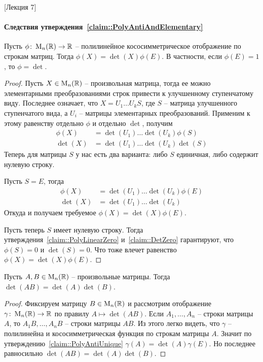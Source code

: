 [Лекция 7]


\paragraph{Следствия утверждения~\ref{claim::PolyAntiAndElementary}}

\begin{claim}
\label{claim::PolyAntiUnique}
Пусть $\phi\colon \operatorname{M}_{n}(\mathbb R)\to \mathbb R$ -- полилинейное кососимметрическое отображение по строкам матриц.
Тогда $\phi(X) = \det(X)\phi(E)$.
В частности, если $\phi(E) = 1$, то $\phi = \det$.
\end{claim}
\begin{proof}
Пусть $X\in\operatorname{M}_{n}(\mathbb R)$ -- произвольная матрица, тогда ее можно элементарными преобразованиями строк привести к улучшенному ступенчатому виду.
Последнее означает, что $X = U_1 \ldots U_k S$, где $S$ -- матрица улучшенного ступенчатого вида, а $U_i$ -- матрицы элементарных преобразований.
Применим к этому равенству отдельно $\phi$ и отдельно $\det$, получим
\begin{align*}
\phi(X) &= \det(U_1)\ldots \det(U_k)\phi(S)\\
\det(X) &= \det(U_1)\ldots \det(U_k)\det(S)
\end{align*}
Теперь для матрицы $S$ у нас есть два варианта: либо $S$ единичная, либо содержит нулевую строку.

Пусть $S = E$, тогда
\begin{align*}
\phi(X) &= \det(U_1)\ldots \det(U_k)\phi(E)\\
\det(X) &= \det(U_1)\ldots \det(U_k)
\end{align*}
Откуда и получаем требуемое $\phi(X) = \det(X)\phi(E)$.

Пусть теперь $S$ имеет нулевую строку.
Тогда утверждения~\ref{claim::PolyLinearZero} и~\ref{claim::DetZero} гарантируют, что $\phi(S) = 0$ и $\det(S) = 0$.
Что тоже влечет равенство $\phi(X) = \det(X)\phi(E)$.
\end{proof}

\begin{claim}
\label{claim::DetMulti}
Пусть $A,B\in\operatorname{M}_{n}(\mathbb R)$ -- произвольные матрицы.
Тогда $\det(AB) = \det(A)\det(B)$.
\end{claim}
\begin{proof}
Фиксируем матрицу $B\in\operatorname{M}_{n}(\mathbb R)$ и рассмотрим отображение $\gamma\colon \operatorname{M}_{n}(\mathbb R)\to \mathbb R$ по правилу $A\mapsto \det(AB)$.
Если $A_1,\ldots, A_n$ -- строки матрицы $A$, то $A_1B, \ldots, A_nB$ -- строки матрицы $AB$.
Из этого легко видеть, что $\gamma$ -- полилинейна и кососимметрическая функция по строкам матрицы $A$.
Значит по утверждению~\ref{claim::PolyAntiUnique} $\gamma(A) = \det(A)\gamma(E)$.
Но последнее равносильно $\det(AB) = \det(A)\det (B)$.
\end{proof}


